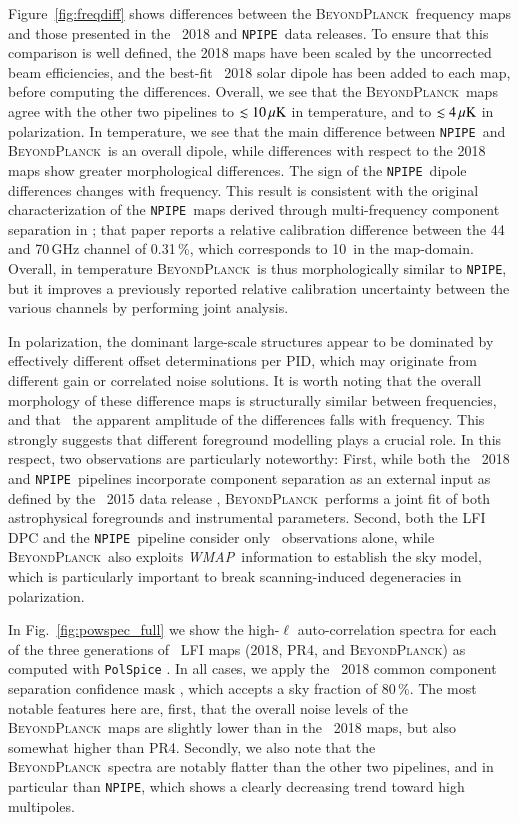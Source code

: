 \documentclass[twocolumn]{aa}
\def\WMAP{\emph{WMAP}}
\newcommand{\BP}{\textsc{BeyondPlanck}}
\newcommand{\npipe}[0]{\texttt{NPIPE}}
\begin{document}
Figure~\ref{fig:freqdiff} shows differences between the \BP\ frequency
maps and those presented in the \Planck\ 2018 and \npipe\ data
releases. To ensure that this comparison is well defined, the 2018
maps have been scaled by the uncorrected beam efficiencies, and the
best-fit \Planck\ 2018 solar dipole has been added to each map, before
computing the differences. Overall, we see that the \BP\ maps agree
with the other two pipelines to $\lesssim 10\muK$ in temperature, and
to $\lesssim 4\muK$ in polarization. In temperature, we see that the
main difference between \npipe\ and \BP\ is an overall dipole, while
differences with respect to the 2018 maps show greater morphological
differences. The sign of the \npipe\ dipole differences changes with
frequency. This result is consistent with the original
characterization of the \npipe\ maps derived through multi-frequency
component separation in \citet{planck2020-LVII}; that paper reports a relative
calibration difference between the 44 and 70\,GHz channel of 0.31\,\%,
which corresponds to 10\muK\ in the map-domain. Overall, in temperature
\BP\ is thus morphologically similar to \npipe, but it improves a
previously reported relative calibration uncertainty between the
various channels by performing joint analysis.

In polarization, the dominant large-scale structures appear to be
dominated by effectively different offset determinations per PID,
which may originate from different gain or correlated noise
solutions. It is worth noting that the overall morphology of these
difference maps is structurally similar between frequencies, and that
\ the apparent amplitude of the differences falls with frequency. This
strongly suggests that different foreground modelling plays a crucial
role. In this respect, two observations are particularly noteworthy:
First, while both the \Planck\ 2018 and \npipe\ pipelines incorporate
component separation as an external input as defined by the
\Planck\ 2015 data release \citep{planck2014-a12}, \BP\ performs a
joint fit of both astrophysical foregrounds and instrumental
parameters. Second, both the LFI DPC and the \npipe\ pipeline consider
only \Planck\ observations alone, while \BP\ also exploits
\WMAP\ information to establish the sky model, which is particularly
important to break scanning-induced degeneracies in polarization.

In Fig.~\ref{fig:powspec_full} we show the high-$\ell$
auto-correlation spectra for each of the three generations of
\Planck\ LFI maps (2018, PR4, and \BP) as computed with
\texttt{PolSpice} \citep{chon2004}. In all cases, we apply the
\Planck\ 2018 common component separation confidence mask
\citep{planck2016-l04}, which accepts a sky fraction of 80\,\%.  The
most notable features here are, first, that the overall noise levels
of the \BP\ maps are slightly lower than in the \Planck\ 2018 maps,
but also somewhat higher than PR4. Secondly, we also note that the
\BP\ spectra are notably flatter than the other two pipelines, and in
particular than \npipe, which shows a clearly decreasing trend toward
high multipoles.
\end{document}
